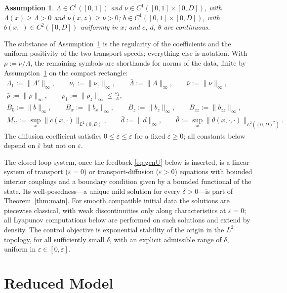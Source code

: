 \documentclass[12pt]{article}
\theoremstyle{plain}
\newtheorem{assumption}{Assumption}
\theoremstyle{remark}
\newcommand{\uL}{\underline\Lambda}
\newcommand{\un}{\underline\nu}
\begin{document}
\begin{assumption}\label{as:coeff}
$\Lambda\in C^1([0,1])$ and $\nu\in C^1([0,1]\times[0,D])$, with $\Lambda(x)\ge\uL>0$ and $\nu(x,z)\ge\un>0$; $b\in C^1([0,1]\times[0,D])$, with $b(x,\cdot)\in C^2([0,D])$ uniformly in $x$; and $c$, $d$, $\theta$ are continuous.
\end{assumption}

The substance of Assumption~\ref{as:coeff} is the regularity of the coefficients and the uniform positivity of the two transport speeds; everything else is notation. With $\rho:=\nu/\Lambda$, the remaining symbols are shorthands for norms of the data, finite by Assumption~\ref{as:coeff} on the compact rectangle:
\begin{gather}
 \Lambda_1:=\|\Lambda'\|_\infty,\qquad
 \nu_1:=\|\nu_z\|_\infty,\qquad
 \bar\Lambda:=\|\Lambda\|_\infty,\qquad
 \bar\nu:=\|\nu\|_\infty,
 \nonumber\\
 \bar\rho:=\|\rho\|_\infty,\qquad
 \rho_1:=\|\rho_z\|_\infty\le\frac{\nu_1}{\uL} ,
 \label{eq:speedconst}\\
 B_0:=\|b\|_\infty,\qquad
 B_x:=\|b_x\|_\infty,\qquad
 B_z:=\|b_z\|_\infty,\qquad
 B_{zz}:=\|b_{zz}\|_\infty,
 \label{eq:bconst}\\
 M_C:=\sup_{x}\|c(x,\cdot)\|_{L^2(0,D)},
 \qquad
 \bar d:=\|d\|_\infty,
 \qquad
 \bar\theta:=\sup_{x}\|\theta(x,\cdot,\cdot)\|_{L^2((0,D)^2)} .
 \label{eq:cdthetaconst}
\end{gather}
The diffusion coefficient satisfies $0\le\varepsilon\le\bar\varepsilon$ for a fixed $\bar\varepsilon\ge0$; all constants below depend on $\bar\varepsilon$ but not on $\varepsilon$.

The closed-loop system, once the feedback \eqref{eq:genU} below is inserted, is a linear system of transport ($\varepsilon=0$) or transport-diffusion ($\varepsilon>0$) equations with bounded interior couplings and a boundary condition given by a bounded functional of the state. Its well-posedness---a unique mild solution for every $\delta>0$---is part of Theorem~\ref{thm:main}. For smooth compatible initial data the solutions are piecewise classical, with weak discontinuities only along characteristics at $\varepsilon=0$; all Lyapunov computations below are performed on such solutions and extend by density. The control objective is exponential stability of the origin in the $L^2$ topology, for all sufficiently small $\delta$, with an explicit admissible range of $\delta$, uniform in $\varepsilon\in[0,\bar\varepsilon]$.

\section{Reduced Model}\label{sec:design}
\end{document}
